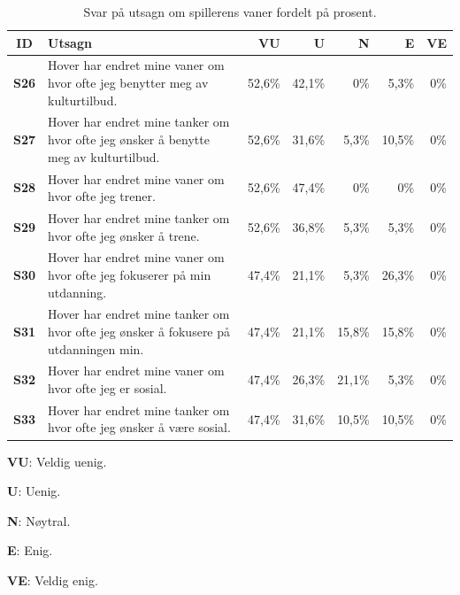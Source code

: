  \begin{table}[H]
    
    \begin{threeparttable}[t]
    \begin{tabularx}{\textwidth}{|>{\bfseries}c|X|r|r|r|r|r|}
        \hline  \textbf{ID} &  \textbf{Utsagn} & \textbf{VU }  &  \textbf{U}  &  \textbf{N}  &  \textbf{E}  &  \textbf{VE}  \\ \hline
        S26 & Hover har endret mine vaner om hvor ofte jeg benytter meg av kulturtilbud.  & 52,6\% & 42,1\% & 0\% & 5,3\% & 0\% \\ 
        S27 & Hover har endret mine tanker om hvor ofte jeg ønsker å benytte meg av kulturtilbud.  & 52,6\% & 31,6\% & 5,3\% & 10,5\% & 0\% \\ 
        S28 & Hover har endret mine vaner om hvor ofte jeg trener.  & 52,6\% & 47,4\% & 0\% & 0\% & 0\% \\ 
        S29 & Hover har endret mine tanker om hvor ofte jeg ønsker å trene.  & 52,6\% & 36,8\% & 5,3\% & 5,3\% & 0\% \\ 
        S30 & Hover har endret mine vaner om hvor ofte jeg fokuserer på min utdanning.  & 47,4\% & 21,1\% & 5,3\% & 26,3\% & 0\% \\ 
        S31 & Hover har endret mine tanker om hvor ofte jeg ønsker å fokusere på utdanningen min.  & 47,4\% & 21,1\% & 15,8\% & 15,8\% & 0\% \\ 
        S32 & Hover har endret mine vaner om hvor ofte jeg er sosial.  & 47,4\% & 26,3\% & 21,1\% & 5,3\% & 0\% \\ 
        S33 & Hover har endret mine tanker om hvor ofte jeg ønsker å være sosial.  & 47,4\% & 31,6\% & 10,5\% & 10,5\% & 0\% \\
         \hline
    \end{tabularx}
    \begin{tablenotes}
    \scriptsize
     \item[] \textbf{VU}: Veldig uenig.
     \item[] \textbf{U}: Uenig.
     \item[] \textbf{N}: Nøytral.
     \item[] \textbf{E}: Enig.
     \item[] \textbf{VE}: Veldig enig.
   \end{tablenotes}
   \end{threeparttable}
   \caption{Svar på utsagn om spillerens vaner fordelt på prosent.}
\end{table}

